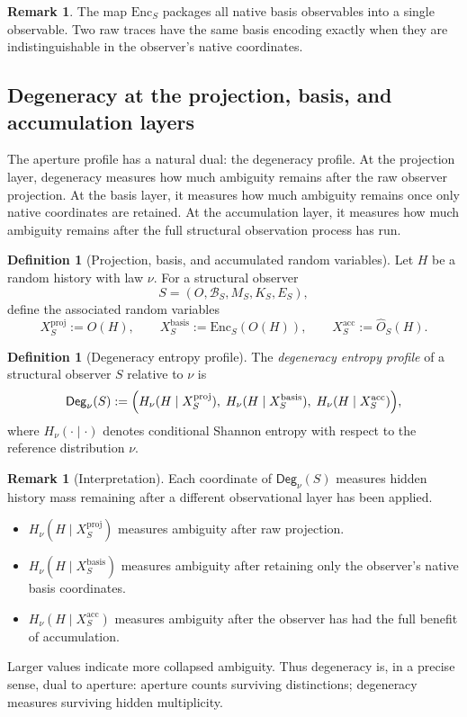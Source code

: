 \documentclass[11pt,twoside]{article}
\theoremstyle{definition}
\newtheorem{definition}[theorem]{Definition}
\newtheorem{remark}[theorem]{Remark}
\newcommand{\Enc}{\mathrm{Enc}}
\newcommand{\proj}{\mathrm{proj}}
\newcommand{\basis}{\mathrm{basis}}
\newcommand{\acc}{\mathrm{acc}}
\begin{document}
\begin{remark}
\label{rem:basis-encoding}
The map \(\Enc_S\) packages all native basis observables into a single observable. Two raw traces have the same basis encoding exactly when they are indistinguishable in the observer's native coordinates.
\end{remark}

\subsection{Degeneracy at the projection, basis, and accumulation layers}
\label{subsec:degeneracy-profile}

The aperture profile has a natural dual: the degeneracy profile. At the projection layer, degeneracy measures how much ambiguity remains after the raw observer projection. At the basis layer, it measures how much ambiguity remains once only native coordinates are retained. At the accumulation layer, it measures how much ambiguity remains after the full structural observation process has run.

\begin{definition}[Projection, basis, and accumulated random variables]
\label{def:projection-basis-acc-rvs}
Let \(H\) be a random history with law \(\nu\). For a structural observer
\[
  S=(O,\mathcal{B}_S,M_S,K_S,E_S),
\]
define the associated random variables
\[
  X_S^{\proj} := O(H),\qquad
  X_S^{\basis} := \Enc_S(O(H)),\qquad
  X_S^{\acc} := \widehat{O}_S(H).
\]
\end{definition}

\begin{definition}[Degeneracy entropy profile]
\label{def:degeneracy-entropy-profile}
The \emph{degeneracy entropy profile} of a structural observer \(S\) relative to \(\nu\) is
\[
  \mathsf{Deg}_\nu(S)
  :=
  \Bigl(
    H_\nu(H \mid X_S^{\proj}),\;
    H_\nu(H \mid X_S^{\basis}),\;
    H_\nu(H \mid X_S^{\acc})
  \Bigr),
\]
where \(H_\nu(\cdot\mid\cdot)\) denotes conditional Shannon entropy with respect to the reference distribution \(\nu\).
\end{definition}

\begin{remark}[Interpretation]
\label{rem:degeneracy-interpretation}
Each coordinate of \(\mathsf{Deg}_\nu(S)\) measures hidden history mass remaining after a different observational layer has been applied.
\begin{itemize}[leftmargin=*]
  \item \(H_\nu(H\mid X_S^{\proj})\) measures ambiguity after raw projection.
  \item \(H_\nu(H\mid X_S^{\basis})\) measures ambiguity after retaining only the observer's native basis coordinates.
  \item \(H_\nu(H\mid X_S^{\acc})\) measures ambiguity after the observer has had the full benefit of accumulation.
\end{itemize}
Larger values indicate more collapsed ambiguity. Thus degeneracy is, in a precise sense, dual to aperture: aperture counts surviving distinctions; degeneracy measures surviving hidden multiplicity.
\end{remark}
\end{document}
